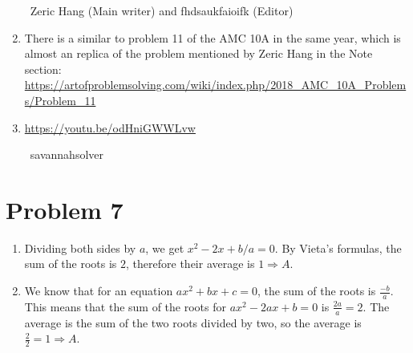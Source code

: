 \documentclass{article}%
\begin{document}
\begin{enumerate}
~Zeric Hang (Main writer) and fhdsaukfaioifk (Editor)

%
\item%
There is a similar to problem 11 of the AMC 10A in the same year, which is almost an replica of the problem mentioned by Zeric Hang in the Note section:
\href{https://artofproblemsolving.com/wiki/index.php/2018_AMC_10A_Problems/Problem_11}{https://artofproblemsolving.com/wiki/index.php/2018\_AMC\_10A\_Problems/Problem\_11}

%
\item%
\href{https://youtu.be/odHniGWWLvw}{https://youtu.be/odHniGWWLvw}

~savannahsolver

%
\end{enumerate}

%
\section*{Problem 7}%
\label{sec:Problem7}%
\begin{enumerate}%
\item%
Dividing both sides by $a$, we get $x^2 - 2x + b/a = 0$. By Vieta's formulas, the sum of the roots is $2$, therefore their average is $1\Rightarrow \boxed{A}$.

%
\item%
We know that for an equation $ax^2 + bx + c = 0$, the sum of the roots is $\frac{-b}{a}$. This means that the sum of the roots for $ax^2 - 2ax + b = 0$ is $\frac{2a}{a}=2$. The average is the sum of the two roots divided by two, so the average is $\frac22 = 1 \Rightarrow \boxed{A}$.

%
\end{enumerate}

%
\end{document}
